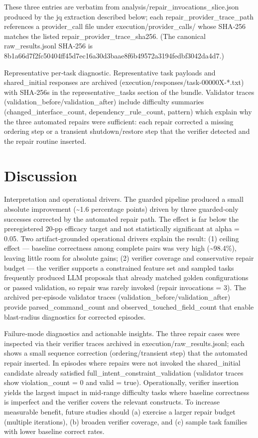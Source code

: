 \documentclass[conference]{IEEEtran}
\begin{document}
These three entries are verbatim from analysis/repair\_invocations\_slice.json produced by the jq extraction described below; each repair\_provider\_trace\_path references a provider\_call file under execution/provider\_calls/ whose SHA‑256 matches the listed repair\_provider\_trace\_sha256. (The canonical raw\_results.jsonl SHA‑256 is 8b1a66d7f2fc50404ff45d7ec16a30d3baae8f6b49572a3194fedbf3042da4d7.)

Representative per‑task diagnostic. Representative task payloads and shared\_initial responses are archived (execution/responses/task-00000X-*.txt) with SHA‑256s in the representative\_tasks section of the bundle. Validator traces (validation\_before/validation\_after) include difficulty summaries (changed\_interface\_count, dependency\_rule\_count, pattern) which explain why the three automated repairs were sufficient: each repair corrected a missing ordering step or a transient shutdown/restore step that the verifier detected and the repair routine inserted.

\section{Discussion}
Interpretation and operational drivers. The guarded pipeline produced a small absolute improvement (\textasciitilde{}1.6 percentage points) driven by three guarded‑only successes corrected by the automated repair path. The effect is far below the preregistered 20‑pp efficacy target and not statistically significant at alpha = 0.05. Two artifact‑grounded operational drivers explain the result: (1) ceiling effect --- baseline correctness among complete pairs was very high (\textasciitilde{}98.4\%), leaving little room for absolute gains; (2) verifier coverage and conservative repair budget --- the verifier supports a constrained feature set and sampled tasks frequently produced LLM proposals that already matched golden configurations or passed validation, so repair was rarely invoked (repair invocations = 3). The archived per‑episode validator traces (validation\_before/validation\_after) provide parsed\_command\_count and observed\_touched\_field\_count that enable blast‑radius diagnostics for corrected episodes.

Failure‑mode diagnostics and actionable insights. The three repair cases were inspected via their verifier traces archived in execution/raw\_results.jsonl; each shows a small sequence correction (ordering/transient step) that the automated repair inserted. In episodes where repairs were not invoked the shared\_initial candidate already satisfied full\_intent\_constraint\_validation (validator traces show violation\_count = 0 and valid = true). Operationally, verifier insertion yields the largest impact in mid‑range difficulty tasks where baseline correctness is imperfect and the verifier covers the relevant constructs. To increase measurable benefit, future studies should (a) exercise a larger repair budget (multiple iterations), (b) broaden verifier coverage, and (c) sample task families with lower baseline correct rates.
\end{document}

